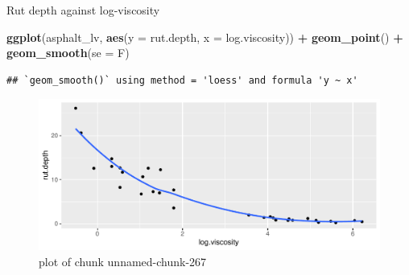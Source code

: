 \documentclass[ignorenonframetext,]{beamer}
\newenvironment{Shaded}{\begin{snugshade}}{\end{snugshade}}
\newcommand{\DataTypeTok}[1]{\textcolor[rgb]{0.13,0.29,0.53}{#1}}
\newcommand{\KeywordTok}[1]{\textcolor[rgb]{0.13,0.29,0.53}{\textbf{#1}}}
\newcommand{\NormalTok}[1]{#1}
\newcommand{\OperatorTok}[1]{\textcolor[rgb]{0.81,0.36,0.00}{\textbf{#1}}}
\newcommand{\StringTok}[1]{\textcolor[rgb]{0.31,0.60,0.02}{#1}}
\begin{document}
\begin{frame}[fragile]{Rut depth against log-viscosity}
\protect\hypertarget{rut-depth-against-log-viscosity}{}

\begin{Shaded}
\begin{Highlighting}[]
\KeywordTok{ggplot}\NormalTok{(asphalt_lv, }\KeywordTok{aes}\NormalTok{(}\DataTypeTok{y =}\NormalTok{ rut.depth, }\DataTypeTok{x =}\NormalTok{ log.viscosity)) }\OperatorTok{+}
\StringTok{  }\KeywordTok{geom_point}\NormalTok{() }\OperatorTok{+}\StringTok{ }\KeywordTok{geom_smooth}\NormalTok{(}\DataTypeTok{se =}\NormalTok{ F)}
\end{Highlighting}
\end{Shaded}

\begin{verbatim}
## `geom_smooth()` using method = 'loess' and formula 'y ~ x'
\end{verbatim}

\begin{figure}
\centering
\includegraphics{figure/unnamed-chunk-267-1.pdf}
\caption{plot of chunk unnamed-chunk-267}
\end{figure}

\end{frame}
\end{document}
